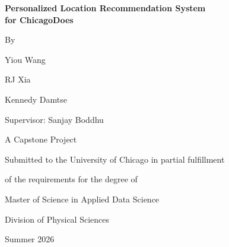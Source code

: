 \documentclass[12pt,letterpaper]{article}
\begin{document}
\begin{titlepage}
  \thispagestyle{empty}
  \centering
  \vspace*{1.4in}

  {\fontsize{18}{22}\selectfont\bfseries
   Personalized Location Recommendation System\\
   for ChicagoDoes\par}
  \vspace{0.4in}

  {\fontsize{12}{14}\selectfont By\par}
  \vspace{6pt}
  {\fontsize{12}{14}\selectfont Yiou Wang\par}
  {\fontsize{12}{14}\selectfont RJ Xia\par}
  {\fontsize{12}{14}\selectfont Kennedy Damtse\par}
  \vspace{6pt}
  {\fontsize{12}{14}\selectfont Supervisor: Sanjay Boddhu\par}

  \vspace{0.6in}

  {\fontsize{14}{17}\selectfont A Capstone Project\par}
  \vspace{4pt}
  {\fontsize{14}{17}\selectfont Submitted to the University of Chicago in partial fulfillment\par}
  \vspace{4pt}
  {\fontsize{14}{17}\selectfont of the requirements for the degree of\par}
  \vspace{4pt}
  {\fontsize{14}{17}\selectfont Master of Science in Applied Data Science\par}
  \vspace{4pt}
  {\fontsize{14}{17}\selectfont Division of Physical Sciences\par}
  \vspace{4pt}
  {\fontsize{14}{17}\selectfont Summer 2026\par}

  \vfill
\end{titlepage}

\setcounter{page}{1}
\pagestyle{frontmatter}

\end{document}
